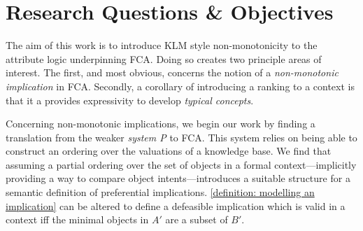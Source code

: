 \section{Research Questions \& Objectives}
\label{section: research objectives}

The aim of this work is to introduce KLM style non-monotonicity to the attribute logic underpinning FCA. Doing so creates two principle areas of interest. The first, and most obvious, concerns the notion of a \textit{non-monotonic implication} in FCA. Secondly, a corollary of introducing a ranking to a context is that it a provides expressivity to develop \textit{typical concepts}.

Concerning non-monotonic implications, we begin our work by finding a translation from the weaker \textit{system P} to FCA. This system relies on being able to construct an ordering over the valuations of a knowledge base. We find that assuming a partial ordering over the set of objects in a formal context—implicitly providing a way to compare object intents—introduces a suitable structure for a semantic definition of preferential implications. \cref{definition: modelling an implication} can be altered to define a defeasible implication which is valid in a context iff the minimal objects in $A'$ are a subset of $B'$.

